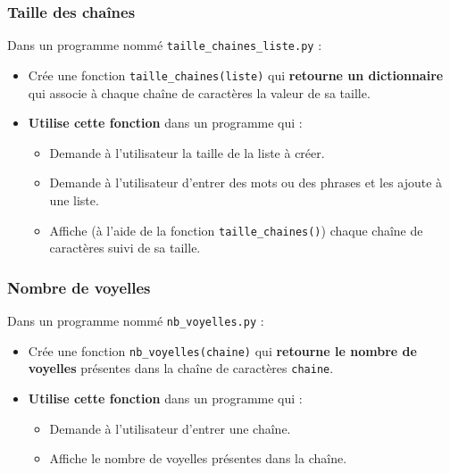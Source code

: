 \documentclass[11pt]{article}
\begin{document}
\subsubsection*{Taille des chaînes}
\label{sec:org8c20096}
Dans un programme nommé \texttt{taille\_chaines\_liste.py} :
\begin{itemize}
\item Crée une fonction \texttt{taille\_chaines(liste)} qui \textbf{retourne un dictionnaire} qui associe à chaque chaîne de caractères la valeur de sa taille.
\item \textbf{Utilise cette fonction} dans un programme qui :
\begin{itemize}
\item Demande à l'utilisateur la taille de la liste à créer.
\item Demande à l'utilisateur d'entrer des mots ou des phrases et les ajoute à une liste.
\item Affiche (à l'aide de la fonction \texttt{taille\_chaines()}) chaque chaîne de caractères suivi de sa taille.
\end{itemize}
\end{itemize}

\subsubsection*{Nombre de voyelles}
\label{sec:org145f9f7}
Dans un programme nommé \texttt{nb\_voyelles.py} :
\begin{itemize}
\item Crée une fonction \texttt{nb\_voyelles(chaine)} qui \textbf{retourne le nombre de voyelles} présentes dans la chaîne de caractères \texttt{chaine}.
\item \textbf{Utilise cette fonction} dans un programme qui :
\begin{itemize}
\item Demande à l'utilisateur d'entrer une chaîne.
\item Affiche le nombre de voyelles présentes dans la chaîne.
\end{itemize}
\end{itemize}
\end{document}
